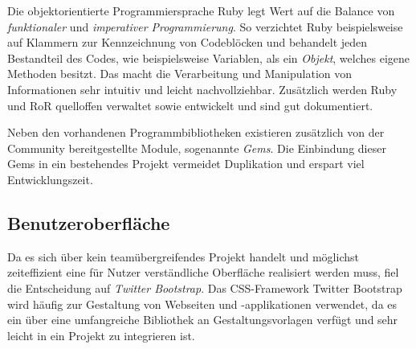 Die objektorientierte Programmiersprache Ruby legt Wert auf die Balance von \textit{funktionaler} und
\textit{imperativer Programmierung}. So verzichtet Ruby beispielsweise auf Klammern zur Kennzeichnung
von Codeblöcken und behandelt jeden Bestandteil des Codes, wie beispielsweise Variablen, als ein \textit{Objekt},
welches eigene Methoden besitzt. Das macht die Verarbeitung und Manipulation von Informationen sehr
intuitiv und leicht nachvollziehbar. Zusätzlich werden Ruby und \acs{RoR}
quelloffen verwaltet sowie entwickelt und sind gut dokumentiert.

Neben den vorhandenen Programmbibliotheken existieren zusätzlich von der Community bereitgestellte Module,
sogenannte \textit{Gems}. Die Einbindung dieser Gems in ein bestehendes Projekt vermeidet
Duplikation und erspart viel Entwicklungszeit.

\subsection{Benutzeroberfläche}
\label{sec:Benutzeroberfläche}
Da es sich über kein teamübergreifendes Projekt handelt und möglichst zeiteffizient
eine für Nutzer verständliche Oberfläche realisiert werden muss, fiel die Entscheidung auf
\textit{Twitter Bootstrap}.
Das CSS-Framework Twitter Bootstrap wird häufig zur Gestaltung von Webseiten und
-applikationen verwendet, da es ein über eine umfangreiche Bibliothek an Gestaltungsvorlagen
verfügt und sehr leicht in ein Projekt zu integrieren ist.


